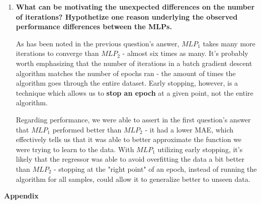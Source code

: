 \documentclass[12pt]{article}
\begin{document}
\begin{enumerate}[leftmargin=\labelsep,resume]
  \item \textbf{What can be motivating the unexpected differences on the number of iterations?
          Hypothetize one reason underlying the observed performance differences between the MLPs.}

        As has been noted in the previous question's answer, $MLP_1$ takes many more
        iterations to converge than $MLP_2$ - almost six times as many. It's probably
        worth emphasizing that the number of iterations in a batch gradient descent
        algorithm matches the number of epochs ran - the amount of times the algorithm goes
        through the entire dataset. Early stopping, however, is a technique which
        allows us to \textbf{stop an epoch} at a given point, not the entire algorithm.


        Regarding performance, we were able to assert in the first question's answer
        that $MLP_1$ performed better than $MLP_2$ - it had a lower MAE, which
        effectively tells us that it was able to better approximate the function
        we were trying to learn to the data. With $MLP_1$ utilizing early stopping,
        it's likely that the regressor was able to avoid overfitting the data
        a bit better than $MLP_2$ - stopping at the "right point" of an epoch, instead
        of running the algorithm for all samples, could allow it to generalize
        better to unseen data.


\end{enumerate}

\pagebreak

\large{\textbf{Appendix}\vskip 0.3cm}



\end{document}
